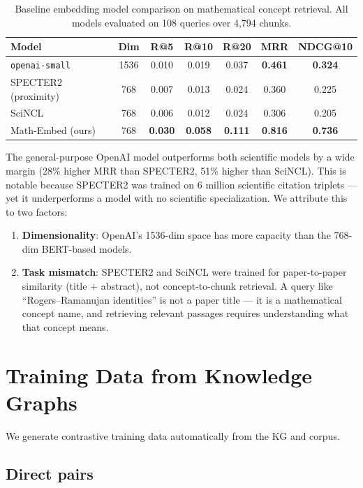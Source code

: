 \documentclass[11pt,a4paper]{article}
\begin{document}
\begin{table}[h]
\centering
\caption{Baseline embedding model comparison on mathematical concept retrieval.
All models evaluated on 108 queries over 4,794 chunks.}
\label{tab:baselines}
\begin{tabular}{lcccccc}
\toprule
Model & Dim & R@5 & R@10 & R@20 & MRR & NDCG@10 \\
\midrule
\texttt{openai-small} & 1536 & 0.010 & 0.019 & 0.037 & \textbf{0.461} & \textbf{0.324} \\
SPECTER2 (proximity) & 768 & 0.007 & 0.013 & 0.024 & 0.360 & 0.225 \\
SciNCL & 768 & 0.006 & 0.012 & 0.024 & 0.306 & 0.205 \\
\midrule
Math-Embed (ours) & 768 & \textbf{0.030} & \textbf{0.058} & \textbf{0.111} & \textbf{0.816} & \textbf{0.736} \\
\bottomrule
\end{tabular}
\end{table}

The general-purpose OpenAI model outperforms both scientific models by a wide
margin (28\% higher MRR than SPECTER2, 51\% higher than SciNCL). This is
notable because SPECTER2 was trained on 6 million scientific citation triplets
--- yet it underperforms a model with no scientific specialization. We
attribute this to two factors:
\begin{enumerate}[nosep]
    \item \textbf{Dimensionality}: OpenAI's 1536-dim space has more capacity
          than the 768-dim BERT-based models.
    \item \textbf{Task mismatch}: SPECTER2 and SciNCL were trained for
          paper-to-paper similarity (title + abstract), not concept-to-chunk
          retrieval. A query like ``Rogers--Ramanujan identities'' is not a
          paper title --- it is a mathematical concept name, and retrieving
          relevant passages requires understanding what that concept means.
\end{enumerate}


\section{Training Data from Knowledge Graphs}
\label{sec:training-data}

We generate contrastive training data automatically from the KG and corpus.

\subsection{Direct pairs}
\end{document}
